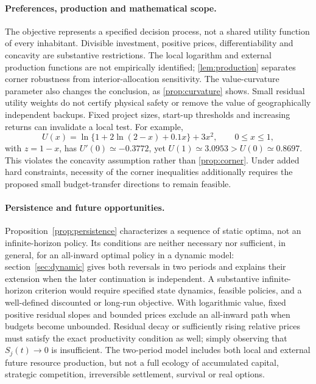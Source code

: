 \paragraph{Preferences, production and mathematical scope.}
The objective represents a specified decision process, not a shared
utility function of every inhabitant. Divisible investment, positive
prices, differentiability and concavity are substantive restrictions.
The local logarithm and external production functions are not empirically
identified; \cref{lem:production} separates corner robustness from
interior-allocation sensitivity. The value-curvature parameter also
changes the conclusion, as \cref{prop:curvature} shows. Small residual
utility weights do not certify physical safety or remove the value of
geographically independent backups. Fixed project sizes, start-up
thresholds and increasing returns can invalidate a local test. For example,
\begin{equation}
 U(x)=\ln\{1+2\ln(2-x)+0.1x\}+3x^2,\qquad 0\leq x\leq1,
 \label{eq:nonconcave}
\end{equation}
with $z=1-x$, has $U'(0)\simeq-0.3772$, yet
$U(1)\simeq3.0953>U(0)\simeq0.8697$. This violates the concavity
assumption rather than \cref{prop:corner}. Under added hard constraints,
necessity of the corner inequalities additionally requires the proposed
small budget-transfer directions to remain feasible.

\paragraph{Persistence and future opportunities.}
Proposition~\ref{prop:persistence} characterizes a sequence of static
optima, not an infinite-horizon policy. Its conditions are neither
necessary nor sufficient, in general, for an all-inward optimal policy
in a dynamic model: section~\ref{sec:dynamic} gives both reversals in two periods and
explains their extension when the later continuation is independent.
A substantive infinite-horizon criterion would require specified state
dynamics, feasible policies, and a well-defined discounted or long-run
objective. With logarithmic value, fixed positive residual slopes and bounded prices
exclude an all-inward path when budgets become unbounded. Residual decay
or sufficiently rising relative prices must satisfy the exact productivity
condition as well; simply observing that $S_j(t)\to0$ is insufficient.
The two-period model includes both local and external future resource
production, but not a full ecology of accumulated capital, strategic
competition, irreversible settlement, survival or real options.

